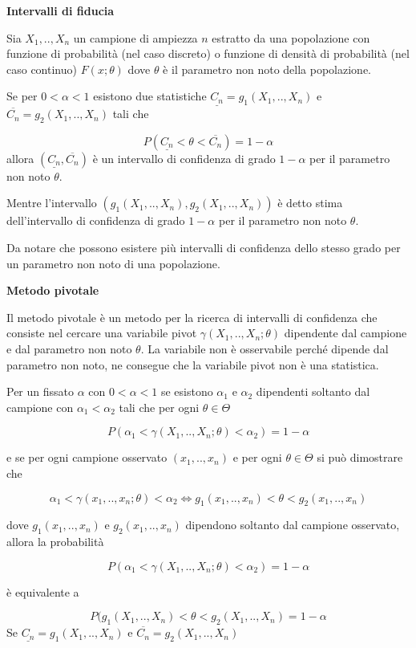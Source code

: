 \documentclass[]{book}
\begin{document}
\textbf{Intervalli di fiducia}

Sia \(X_1,..,X_n\) un campione di ampiezza \(n\) estratto da una
popolazione con funzione di probabilità (nel caso discreto) o funzione
di densità di probabilità (nel caso continuo) \(F(x; \theta)\) dove
\(\theta\) è il parametro non noto della popolazione.

Se per \(0 < \alpha < 1\) esistono due statistiche
\(\underline{C_n} = g_1(X_1,..,X_n)\) e
\(\overline{C_n} = g_2(X_1,..,X_n)\) tali che

\[P(\underline{C_n} < \theta < \overline{C_n}) = 1 - \alpha\] allora
\((\underline{C_n},\overline{C_n})\) è un intervallo di confidenza di
grado \(1 - \alpha\) per il parametro non noto \(\theta\).

Mentre l'intervallo \((g_1(X_1,..,X_n), g_2(X_1,..,X_n))\) è detto stima
dell'intervallo di confidenza di grado \(1 - \alpha\) per il parametro
non noto \(\theta\).

Da notare che possono esistere più intervalli di confidenza dello stesso
grado per un parametro non noto di una popolazione.

\textbf{Metodo pivotale}

Il metodo pivotale è un metodo per la ricerca di intervalli di
confidenza che consiste nel cercare una variabile pivot
\(\gamma(X_1,..,X_n; \theta)\) dipendente dal campione e dal parametro
non noto \(\theta\). La variabile non è osservabile perché dipende dal
parametro non noto, ne consegue che la variabile pivot non è una
statistica.

Per un fissato \(\alpha\) con \(0 < \alpha < 1\) se esistono
\(\alpha_1\) e \(\alpha_2\) dipendenti soltanto dal campione con
\(\alpha_1 < \alpha_2\) tali che per ogni \(\theta \in \Theta\)

\[P(\alpha_1 < \gamma(X_1,..,X_n; \theta) < \alpha_2) = 1 - \alpha\]

e se per ogni campione osservato \((x_1,..,x_n)\) e per ogni
\(\theta \in \Theta\) si può dimostrare che

\[\alpha_1 < \gamma(x_1,..,x_n; \theta) < \alpha_2 \Leftrightarrow g_1(x_1,..,x_n) < \theta < g_2(x_1,..,x_n)\]

dove \(g_1(x_1,..,x_n)\) e \(g_2(x_1,..,x_n)\) dipendono soltanto dal
campione osservato, allora la probabilità

\[P(\alpha_1 < \gamma(X_1,..,X_n; \theta) < \alpha_2) = 1 - \alpha\]

è equivalente a

\[P(g_1(X_1,..,X_n) < \theta < g_2(X_1,..,X_n) = 1 - \alpha\] Se
\(\underline{C_n} = g_1(X_1,..,X_n)\) e
\(\overline{C_n} = g_2(X_1,..,X_n)\)
\end{document}
